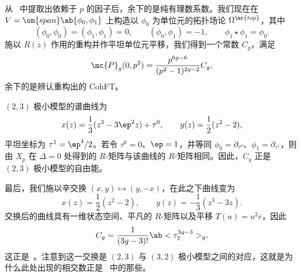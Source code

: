 从~ 中提取出依赖于 \(p\) 的因子后，余下的是纯有理数系数。我们现在在 \(V = \on{span}\ab\{\phi_0,\phi_1\}\) 上构造以 \(\phi_0\) 为单位元的拓扑场论 \(\Omega^{\mr{top}}\)，其中
\[ (\phi_0,\phi_0) = (\phi_1,\phi_1) = 0, \qquad (\phi_0,\phi_1) = -1, \qquad \phi_1 \star \phi_1 = \phi_0. \]
施以 \(R(z)\) 作用的重构并作平坦单位元平移，我们得到一个常数 \(C_g\)，满足
\[ \mc{P}_g(0,p^2) = \frac{p^{6g-6}}{(p^2-1)^{2g-2}}C_g, \]
余下的是辨认重构出的 CohFT。

\((2,3)\) 极小模型的谱曲线为
\[ x(z) = \frac{1}{3}(z^3-3\ep^2 z) + \tau^0, \qquad y(z) = \frac{1}{2}(z^2-2), \]
平坦坐标为 \(\tau^1 = \ep^4/2\)。若令 \(\tau^0 = 0\)、\(\ep = 1\)，并等同 \(\phi_0 = \partial_{\tau^0}\)、\(\phi_1 = \partial_{\tau^1}\)，则由 \(X_p\) 在 \(\Delta = 0\) 处得到的 \(R\)-矩阵与该曲线的 \(R\)-矩阵相同。因此，\(C_g\) 正是 \((2,3)\) 极小模型的自由能。

最后，我们施以辛交换 \((x,y) \mapsto (y,-x)\)，在此之下曲线变为
\[ x(z) = \frac{1}{2}(z^2-2), \qquad y(z) = -\frac{1}{3}(z^3-3z). \]
交换后的曲线具有一维状态空间、平凡的 \(R\)-矩阵以及平移 \(T(u) = u^2 \bar{e}\)，因此
\[ C_g = \frac{1}{(3g-3)!}\ab<\tau_2^{3g-3}>_g, \]
这正是~。注意到这一交换是 \((2,3)\) 与 \((3,2)\) 极小模型之间的对应，这就是为什么此处出现的相交数正是~ 中的那些。

